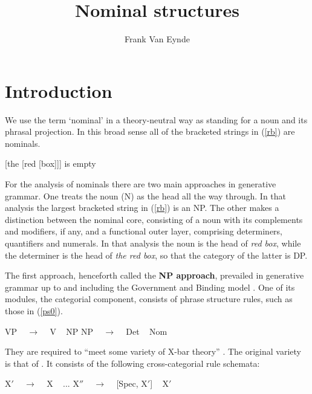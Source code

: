 \documentclass[output=paper]{langsci/langscibook}
\author{Frank Van Eynde\affiliation{University of Leuven}}
\title{Nominal structures}
\begin{document}
\label{chap-np}

\section{Introduction}


We use the term `nominal' in a theory-neutral way as standing for a noun
and its phrasal projection. In this broad sense all of the bracketed 
strings in (\ref{rb}) are nominals. 

\begin{exe} 
\ex\label{rb}  [the [red [box]]] is empty
\end{exe} 
  
\noindent
For the analysis of nominals there are two main approaches in generative grammar. 
One treats the noun (N) as the head all the way through. In that analysis the 
largest bracketed string in (\ref{rb}) is an NP. 
The other makes a distinction between the nominal core, 
consisting of a noun with its complements and modifiers, if any,  
and a functional outer layer, comprising determiners, quantifiers and 
numerals. In that analysis the noun is the head of \emph{red box}, 
while the determiner is the head of \emph{the red box}, so that the category 
of the latter is DP. 

The first approach, henceforth called the {\bf NP approach}, prevailed in 
generative grammar up to and including the Government and Binding model
\citep{Chomsky81}. One of its modules, the categorial component, 
consists of phrase structure rules, such as those in (\ref{ps0}). 

\begin{exe} 
\ex\label{ps0}   
\begin{xlist}
\ex  VP ~ $\rightarrow$ ~ V ~ NP 
\ex  NP ~ $\rightarrow$ ~ Det ~ Nom
\end{xlist} 
\end{exe}

\noindent
They are required to ``meet some variety of X-bar theory'' \citep[5]{Chomsky81}. 
The original variety is that of \citet{Chomsky70}. It consists of the following
cross-categorial rule schemata:

\begin{exe} 
\ex\label{xbar} 
\begin{xlist} 
\ex\label{xbar1}   X$'$ ~ $\rightarrow$ ~ X ~  ... 
\ex\label{xbar2}   X$''$ ~ $\rightarrow$ ~ [Spec, X$'$] ~ X$'$ 
\end{xlist} 
\end{exe} 
\end{document}
